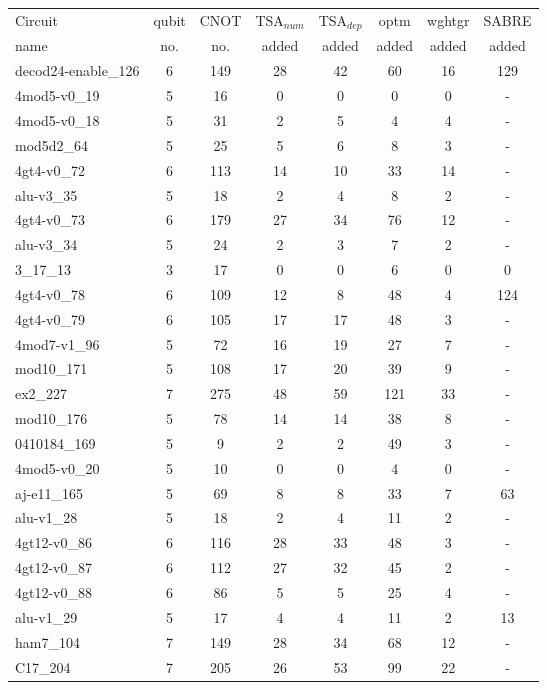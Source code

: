 \documentclass[journal]{IEEEtran}
\begin{document}
\begin{table*}[htbp]
    \begin{center}  
    \begin{tabular}{|p{4.3cm}<{\centering}|c|c|c|c|c|c|c|}
    \hline
    Circuit &  qubit  & CNOT &TSA$_{num}$& TSA$_{dep}$  & optm 	 & wghtgr  &SABRE 	\\
     name	&   no. 	&	no. & added&  added &  added 	&  added&  added\\
    \hline
    decod24-enable\_126 & 6 & 149 & 28 & 42 & 60 & 16 &129\\ 
4mod5-v0\_19 & 5 & 16 & 0 & 0 & 0 & 0&- \\ 
4mod5-v0\_18 & 5 & 31 & 2 & 5 & 4 & 4 &-\\ 
mod5d2\_64 & 5 & 25 & 5 & 6 & 8 & 3&- \\ 
4gt4-v0\_72 & 6 & 113 & 14 & 10 & 33 & 14&- \\ 
alu-v3\_35 & 5 & 18 & 2 & 4 & 8 & 2 &-\\ 
4gt4-v0\_73 & 6 & 179 & 27 & 34 & 76 & 12&- \\ 
alu-v3\_34 & 5 & 24 & 2 & 3 & 7 & 2& - 	\\
3\_17\_13 & 3 & 17 & 0 & 0 & 6 & 0& 0 	\\
4gt4-v0\_78 & 6 & 109 & 12 & 8 & 48 & 4& 124 	\\
4gt4-v0\_79 & 6 & 105 & 17 & 17 & 48 & 3& - 	\\
4mod7-v1\_96 & 5 & 72 & 16 & 19 & 27 & 7& - 	\\
mod10\_171 & 5 & 108 & 17 & 20 & 39 & 9& - 	\\
ex2\_227 & 7 & 275 & 48 & 59 & 121 & 33& - 	\\
mod10\_176 & 5 & 78 & 14 & 14 & 38 & 8& - 	\\
0410184\_169 & 5 & 9 & 2 & 2 & 49 & 3& - 	\\
4mod5-v0\_20 & 5 & 10 & 0 & 0 & 4 & 0& - 	\\
aj-e11\_165 & 5 & 69 & 8 & 8 & 33 & 7& 63 	\\
alu-v1\_28 & 5 & 18 & 2 & 4 & 11 & 2& - 	\\
4gt12-v0\_86 & 6 & 116 & 28 & 33 & 48 & 3& - 	\\
4gt12-v0\_87 & 6 & 112 & 27 & 32 & 45 & 2& - 	\\
4gt12-v0\_88 & 6 & 86 & 5 & 5 & 25 & 4& - 	\\
alu-v1\_29 & 5 & 17 & 4 & 4 & 11 & 2& 13 	\\
ham7\_104 & 7 & 149 & 28 & 34 & 68 & 12& - 	\\
C17\_204 & 7 & 205 & 26 & 53 & 99 & 22& - 	\\

\end{tabular}
\end{center}
\end{table*}
\end{document}
